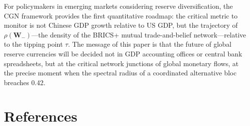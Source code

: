 \documentclass[12pt, letterpaper]{article}
\theoremstyle{definition}
\begin{document}
For policymakers in emerging markets considering reserve diversification, the CGN framework provides the first quantitative roadmap: the critical metric to monitor is not Chinese GDP growth relative to US GDP, but the trajectory of $\rho(\mathbf{W}_-)$---the density of the BRICS+ mutual trade-and-belief network---relative to the tipping point $\tau$. The message of this paper is that the future of global reserve currencies will be decided not in GDP accounting offices or central bank spreadsheets, but at the critical network junctions of global monetary flows, at the precise moment when the spectral radius of a coordinated alternative bloc breaches 0.42.

\newpage
\singlespacing

\section*{References}
\end{document}
